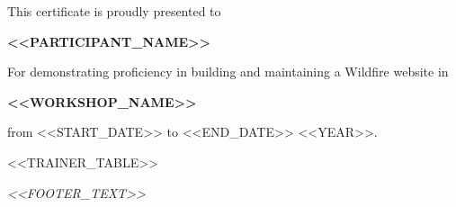 \documentclass[a4paper, landscape]{article}
\begin{document}
\begin{center}
    \vspace{0.2in}

    This certificate is proudly presented to

    \vspace{0.45in}

    {\color{KalaamBlue} \fontsize{48pt}{50pt}\selectfont \textbf{<<PARTICIPANT_NAME>>}}

    \vspace{0.45in}

    For demonstrating proficiency in building and maintaining a Wildfire website in

    \vspace{0.25in}

    {\huge \textbf{<<WORKSHOP_NAME>>}}

    \vspace{0.2in}

    from <<START_DATE>> to <<END_DATE>> <<YEAR>>.

    \vspace{0.8in} %

    <<TRAINER_TABLE>>

    \vspace{0.4in}

    {\small \textit{<<FOOTER_TEXT>>}}

\end{center}
\end{document}
